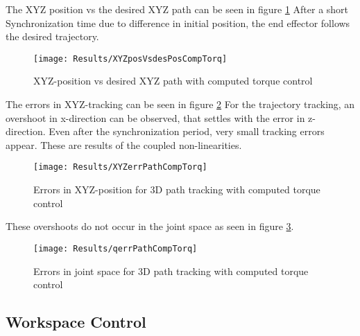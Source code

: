 The XYZ position vs the desired XYZ path can be seen in figure \ref{fig:XYZposVsdesPosCompTorq}%
After a short Synchronization time due to difference in initial position, the end effector follows the desired trajectory.
\begin{figure}[H]
	\texttt{[image: Results/XYZposVsdesPosCompTorq]}
	\caption{XYZ-position vs desired XYZ path with computed torque control}
	\label{fig:XYZposVsdesPosCompTorq}
\end{figure}
The errors in XYZ-tracking can be seen in figure \ref{fig:XYZerrPathCompTorq} %
For the trajectory tracking, an overshoot in x-direction can be observed, that settles with the error in z-direction. 
Even after the synchronization period, very small tracking errors appear. These are results of the coupled non-linearities.
\begin{figure}[H]
	\texttt{[image: Results/XYZerrPathCompTorq]}
	\caption{Errors in XYZ-position for 3D path tracking with computed torque control}
	\label{fig:XYZerrPathCompTorq}
\end{figure}

These overshoots do not occur in the joint space as seen in figure \ref{fig:qerrPathCompTorq}.
\begin{figure}[H]
	\texttt{[image: Results/qerrPathCompTorq]}
	\caption{Errors in joint space for 3D path tracking with computed torque control}
	\label{fig:qerrPathCompTorq}
\end{figure}




\subsection{Workspace Control}

